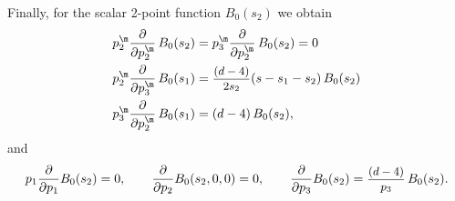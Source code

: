 \documentclass[a4paper,11pt,openright,twoside]{book}
\newcommand{\sdfrac}[2]{\mbox{\small$\displaystyle\frac{#1}{#2}$}}
\numberwithin{equation}{section}
\begin{document}
{{Finally, for the scalar 2-point function $B_0(s_2)$ we obtain
\begin{subequations}
	\begin{align}
		p_2^\m\frac{\partial}{\partial p_2^\m}\,B_0(s_2)&=p_3^\m\frac{\partial}{\partial p_2^\m}\,B_0(s_2)=0\\
		p_2^\m\frac{\partial}{\partial p_3^\m}\,B_0(s_1)&=\sdfrac{( d-4)}{2s_2}(s-s_1-s_2)\,B_0(s_2)\\
		p_3^\m\frac{\partial}{\partial p_2^\m}\,B_0(s_1)&=( d-4)\,B_0(s_2),
	\end{align}
\end{subequations}
and
\begin{subequations}
	\begin{align}
		p_1\frac{\partial}{\partial p_1}B_0(s_2)=0,\qquad\frac{\partial}{\partial p_2}B_0(s_2,0,0)=0,\qquad
		\frac{\partial}{\partial p_3}B_0(s_2)=\sdfrac{( d-4)}{p_3}\,B_0(s_2).
	\end{align}
\end{subequations}

}}
\end{document}
